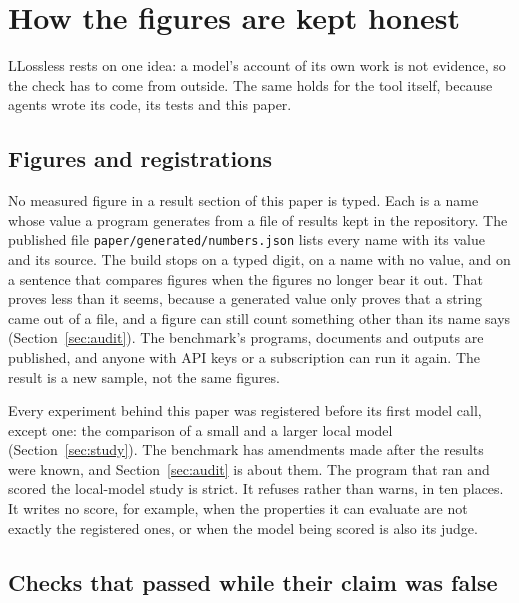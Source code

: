 \section{How the figures are kept honest}
\label{sec:trust}

LLossless rests on one idea: a model's account of its own work is not evidence, so the check has to come from outside. The same holds for the tool itself, because agents wrote its code, its tests and this paper.

\subsection{Figures and registrations}

No measured figure in a result section of this paper is typed. Each is a name whose value a program generates from a file of results kept in the repository. The published file \texttt{paper/generated/numbers.json} lists every name with its value and its source. The build stops on a typed digit, on a name with no value, and on a sentence that compares figures when the figures no longer bear it out. That proves less than it seems, because a generated value only proves that a string came out of a file, and a figure can still count something other than its name says (Section~\ref{sec:audit}). The benchmark's programs, documents and outputs are published, and anyone with API keys or a subscription can run it again. The result is a new sample, not the same figures.

Every experiment behind this paper was registered before its first model call, except one: the comparison of a small and a larger local model (Section~\ref{sec:study}). The benchmark has  amendments made after the results were known, and Section~\ref{sec:audit} is about them. The program that ran and scored the local-model study is strict. It refuses rather than warns, in ten places. It writes no score, for example, when the properties it can evaluate are not exactly the registered ones, or when the model being scored is also its judge.

\subsection{Checks that passed while their claim was false}
\label{sec:blind-spots}

